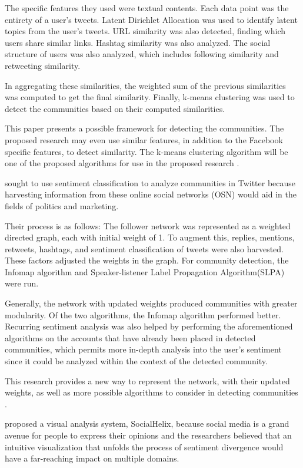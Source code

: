 The specific features they used were textual contents. Each data point was the entirety of a user’s tweets. Latent Dirichlet Allocation was used to identify latent topics from the user’s tweets. URL similarity was also detected, finding which users share similar links. Hashtag similarity was also analyzed. The social structure of users was also analyzed, which includes following similarity and retweeting similarity. 

In aggregating these similarities, the weighted sum of the previous similarities was computed to get the final similarity. Finally, k-means clustering was used to detect the communities based on their computed similarities. 

This paper presents a possible framework for detecting the communities. The proposed research may even use similar features, in addition to the Facebook specific features, to detect similarity. The k-means clustering algorithm will be one of the proposed algorithms for use in the proposed research \cite{Zhang:2012}.

 sought to use sentiment classification to analyze communities in Twitter because harvesting information from these online social networks (OSN) would aid in the fields of politics and marketing. 

Their process is as follows: The follower network was represented as a weighted directed graph, each with initial weight of 1. To augment this, replies, mentions, retweets, hashtags, and sentiment classification of tweets were also harvested. These factors adjusted the weights in the graph. For community detection, the Infomap algorithm and Speaker-listener Label Propagation Algorithm(SLPA) were run. 

Generally, the network with updated weights produced communities with greater modularity. Of the two algorithms, the Infomap algorithm performed better. Recurring sentiment analysis was also helped by performing the aforementioned algorithms on the accounts that have already been placed in detected communities, which permits more in-depth analysis into the user’s sentiment since it could be analyzed within the context of the detected community.

This research provides a new way to represent the network, with their updated weights, as well as more possible algorithms to consider in detecting communities \cite{Deitrick:2013}.

 proposed a visual analysis system, SocialHelix, because social media is a grand avenue for people to express their opinions and the researchers believed that an intuitive visualization that unfolds the process of sentiment divergence would have a far-reaching impact on multiple domains. 

